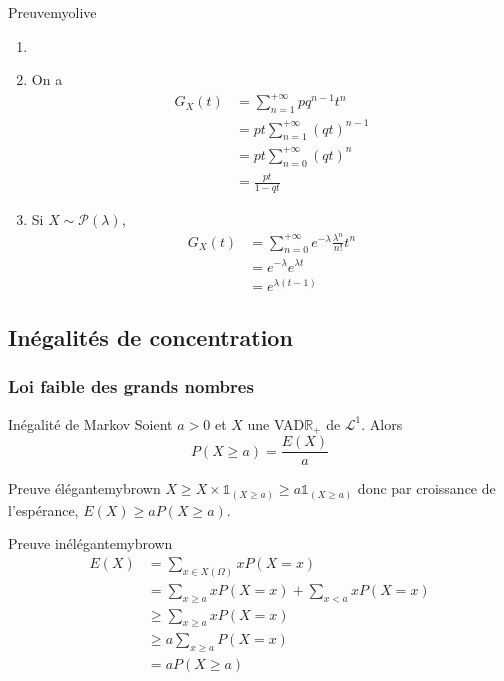     \begin{demo}{Preuve}{myolive}
        \begin{enumerate}
            \item 
            \item On a 
            \begin{align*}
                G_X(t) 
                &= \sum_{n=1}^{+\infty} pq^{n-1} t^n \\
                &= pt \sum_{n=1}^{+\infty} (qt)^{n-1} \\
                &= pt \sum_{n=0}^{+\infty} (qt)^n \\
                &= \frac{pt}{1 - qt} 
            \end{align*}
            \item Si $X \sim \mathcal{P}(\lambda)$, 
            \begin{align*}
                G_X(t) 
                &= \sum_{n=0}^{+\infty} e^{-\lambda} \frac{\lambda^n}{n!} t^n \\
                &= e^{-\lambda} e^{\lambda t} \\
                &= e^{\lambda(t - 1)}
            \end{align*}
        \end{enumerate}
    \end{demo}

\subsection{Inégalités de concentration}

    \subsubsection{Loi faible des grands nombres}

    \begin{lem}{Inégalité de Markov}{}
        Soient $a > 0$ et $X$ une VAD$\mathbb{R}_+$ de $\mathcal{L}^1$. Alors 
        \[ P(X \geq a) = \frac{E(X)}{a} \]    
    \end{lem}

    \begin{demo}{Preuve élégante}{mybrown}
        $X \geq X \times \mathbb{1}_{(X \geq a)} \geq a \mathbb{1}_{(X \geq a)}$ donc par croissance de l’espérance, $E(X) \geq a P(X \geq a)$.
    \end{demo}

    \begin{demo}{Preuve inélégante}{mybrown}
        \begin{align*}
            E(X) &= \sum_{x \in X(\Omega)} x P(X = x) \\
            &= \sum_{x \geq a} x P(X = x) + \sum_{x < a} x P(X = x) \\
            &\geq \sum_{x \geq a} x P(X = x) \\
            &\geq a \sum_{x \geq a} P(X = x) \\
            &= a P(X \geq a)
        \end{align*}
    \end{demo}

